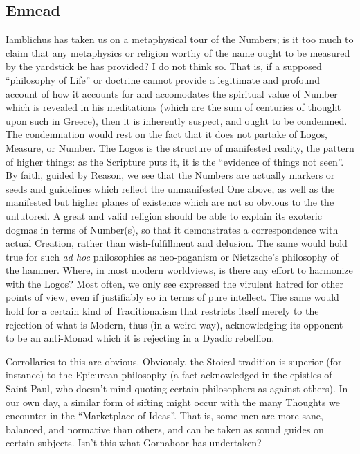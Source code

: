 \subsection{Ennead}

Iamblichus has taken us on a metaphysical tour of the Numbers; is it too much to claim that any metaphysics or religion worthy of the name ought to be measured by the yardstick he has provided? I do not think so. That is, if a supposed ``philosophy of Life'' or doctrine cannot provide a legitimate and profound account of how it accounts for and accomodates the spiritual value of Number which is revealed in his meditations (which are the sum of centuries of thought upon such in Greece), then it is inherently suspect, and ought to be condemned. The condemnation would rest on the fact that it does not partake of Logos, Measure, or Number. The Logos is the structure of manifested reality, the pattern of higher things: as the Scripture puts it, it is the ``evidence of things not seen''. By faith, guided by Reason, we see that the Numbers are actually markers or seeds and guidelines which reflect the unmanifested One above, as well as the manifested but higher planes of existence which are not so obvious to the the untutored. A great and valid religion should be able to explain its exoteric dogmas in terms of Number(s), so that it demonstrates a correspondence with actual Creation, rather than wish-fulfillment and delusion. The same would hold true for such
\emph{ad hoc} philosophies as neo-paganism or Nietzsche's philosophy of the hammer. Where, in most modern worldviews, is there any effort to harmonize with the Logos? Most often, we only see expressed the virulent hatred for other points of view, even if justifiably so in terms of pure intellect. The same would hold for a certain kind of Traditionalism that restricts itself merely to the rejection of what is Modern, thus (in a weird way), acknowledging its opponent to be an anti-Monad which it is rejecting in a Dyadic rebellion.

Corrollaries to this are obvious. Obviously, the Stoical tradition is superior (for instance) to the Epicurean philosophy (a fact acknowledged in the epistles of Saint Paul, who doesn't mind quoting certain philosophers as against others). In our own day, a similar form of sifting might occur with the many Thoughts we encounter in the ``Marketplace of Ideas''. That is, some men are more sane, balanced, and normative than others, and can be taken as sound guides on certain subjects. Isn't this what Gornahoor has undertaken?


